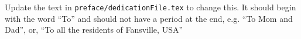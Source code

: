 Update the text in \verb|preface/dedicationFile.tex| to change this.
\break
\break
It should begin with the word ``To'' and should not have a period at the end, e.g. ``To Mom and Dad'', or, ``To all the residents of Fansville, USA''